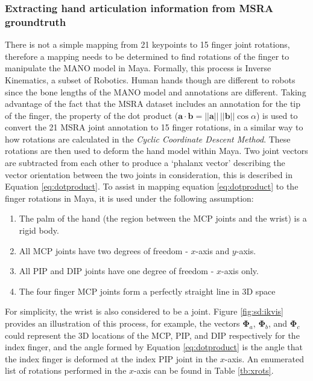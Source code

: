 \subsubsection{Extracting hand articulation information from MSRA groundtruth}
\label{sec:sd:d:ex}
There is not a simple mapping from 21 keypoints to 15 finger joint rotations, therefore a mapping needs to be determined to find rotations of the finger to manipulate the MANO model in Maya. Formally, this process is Inverse Kinematics, a subset of Robotics. Human hands though are different to robots since the bone lengths of the MANO model and annotations are different. Taking advantage of the fact that the MSRA dataset includes an annotation for the tip of the finger, the property of the dot product ($\bm{a}\cdot\bm{b}=||\bm{a}||\,||\bm{b}||\cos{\alpha}$) is used to convert the 21 MSRA joint annotation to 15 finger rotations, in a similar way to how rotations are calculated in the {\slshape Cyclic Coordinate Descent Method}\cite{fedor2003application}. These rotations are then used to deform the hand model within Maya. Two joint vectors are subtracted from each other to produce a `phalanx vector' describing the vector orientation between the two joints in consideration, this is described in Equation \ref{eq:dotproduct}. To assist in mapping equation \ref{eq:dotproduct} to the finger rotations in Maya, it is used under the following assumption:

\begin{enumerate}
    \item The palm of the hand (the region between the MCP joints and the wrist) is a rigid body.
    \item All MCP joints have two degrees of freedom - $x$-axis and $y$-axis.
    \item All PIP and DIP joints have one degree of freedom - $x$-axis only.
    \item The four finger MCP joints form a perfectly straight line in 3D space
\end{enumerate}

For simplicity, the wrist is also considered to be a joint. Figure \ref{fig:sd:ikvis} provides an illustration of this process, for example, the vectors $\bm{\Phi}_a$, $\bm{\Phi}_b$, and $\bm{\Phi}_c$ could represent the 3D locations of the MCP, PIP, and DIP respectively for the index finger, and the angle formed by Equation \ref{eq:dotproduct} is the angle that the index finger is deformed at the index PIP joint in the $x$-axis. An enumerated list of rotations performed in the $x$-axis can be found in Table \ref{tb:xrots}.

